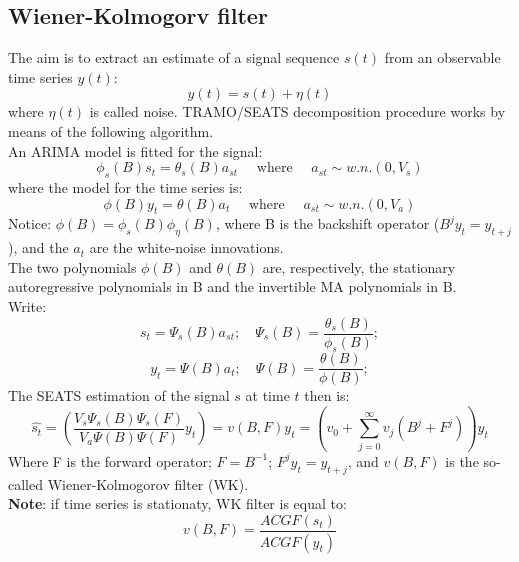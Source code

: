 \documentclass[english,blauw]{cbsdiscussionpaper}
\begin{document}
 \subsection*{Wiener-Kolmogorv filter}
The aim is to extract an estimate of a signal sequence $s(t)$ from an observable time series $y(t)$:
 \begin{equation*}
 y(t)=s(t)+\eta(t)
 \end{equation*}
where $\eta(t)$ is called noise. TRAMO/SEATS decomposition procedure works by means of the following algorithm.\\
An ARIMA model is fitted for the signal:
\begin{equation*}
\phi_{s}(B)s_{t}=\theta_{s}(B)a_{st} \quad \mbox{~where~} \quad a_{st} \sim w.n.(0,V_{s})
\end{equation*}
where the model for the time series is:
\begin{equation*}
\phi(B)y_{t}=\theta(B)a_{t} \quad \mbox{~where~} \quad a_{st}\sim w.n.(0,V_{a})
\end{equation*}
Notice: $\phi(B)=\phi_{s}(B)\phi_{\eta}(B)$, where B is the backshift operator ($B^j y_t=y_{t+j}$), and the $a_t$ are the white-noise innovations.\\The two polynomials $\phi(B)$ and $\theta(B)$ are, respectively, the stationary autoregressive polynomials in B and the invertible MA polynomials in B.\\Write:
\begin{equation*}
s_{t}=\Psi_{s}(B)a_{st}; \quad \Psi_{s}(B)=\frac{\theta_{s}(B)}{\phi_{s}(B)} ;
\end{equation*}
\begin{equation*}
y_{t}=\Psi(B)a_{t}; \quad \Psi(B)=\frac{\theta(B)}{\phi(B)} ;
\end{equation*}
The SEATS estimation of the signal $s$ at time $t$ then is:
\begin{equation*}
\hat{s_{t}}=\left ( \frac {V_{s}\Psi_{s}(B)\Psi_{s}(F)}{V_{a}\Psi(B)\Psi(F)} y_{t}\right )=v(B,F)y_{t}=\left ( v_{0}+\sum\limits_{j=0}^\infty  v_{j} (B^{j}+F^{j}) \right) y_{t}
\end{equation*}
Where F is the forward operator; $F=B^{-1}$; $F^{j}y_{t}=y_{t+j}$, and $v(B,F)$ is the so-called Wiener-Kolmogorov filter (WK).\\\textbf{Note}: if time series is stationaty, WK filter is equal to:
\begin{equation*}
v(B,F)=\frac{ACGF(s_{t})}{ACGF(y_{t})}
\end{equation*}
\end{document}
